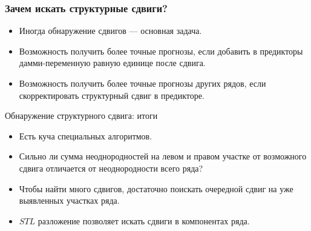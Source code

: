   

\begin{frame}
  \frametitle{Зачем искать структурные сдвиги?}

  \begin{itemize}[<+->]
    \item Иногда обнаружение сдвигов — \alert{основная задача}. 
    \item Возможность получить \alert{более точные} прогнозы, если добавить в предикторы 
    дамми-переменную равную единице после сдвига.
    \item Возможность получить \alert{более точные} прогнозы других рядов, если 
    скорректировать структурный сдвиг в предикторе.
  \end{itemize}
  

\end{frame}


\begin{frame}{Обнаружение структурного сдвига: итоги}

  \begin{itemize}[<+->]
    \item Есть \alert{куча} специальных алгоритмов.
    \item Сильно ли \alert{сумма неоднородностей} на левом и правом участке от возможного сдвига отличается 
    от неоднородности всего ряда?
    \item Чтобы найти \alert{много} сдвигов, достаточно поискать очередной сдвиг на 
    уже выявленных участках ряда.
    \item $STL$ разложение позволяет искать \alert{сдвиги в компонентах} ряда.
 \end{itemize}
\end{frame}

